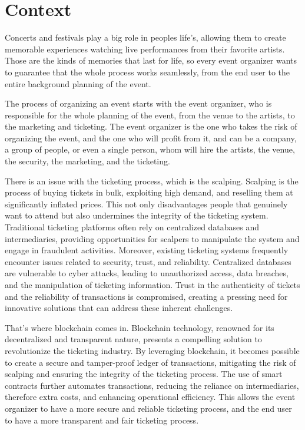 \section{Context}
Concerts and festivals play a big role in peoples life's, allowing them to create memorable experiences watching live performances from their favorite artists. Those are the kinds of memories that last for life, so every event organizer wants to guarantee that the whole process works seamlessly, from the end user to the entire background planning of the event.

The process of organizing an event starts with the event organizer, who is responsible for the whole planning of the event, from the venue to the artists, to the marketing and ticketing. The event organizer is the one who takes the risk of organizing the event, and the one who will profit from it, and can be a company, a group of people, or even a single person, whom will hire the artists, the venue, the security, the marketing, and the ticketing.

There is an issue with the ticketing process, which is the scalping. Scalping is the process of buying tickets in bulk, exploiting high demand, and reselling them at significantly inflated prices. This not only disadvantages people that genuinely want to attend but also undermines the integrity of the ticketing system. Traditional ticketing platforms often rely on centralized databases and intermediaries, providing opportunities for scalpers to manipulate the system and engage in fraudulent activities.
Moreover, existing ticketing systems frequently encounter issues related to security, trust, and reliability. Centralized databases are vulnerable to cyber attacks, leading to unauthorized access, data breaches, and the manipulation of ticketing information. Trust in the authenticity of tickets and the reliability of transactions is compromised, creating a pressing need for innovative solutions that can address these inherent challenges.

That's where blockchain comes in. Blockchain technology, renowned for its decentralized and transparent nature, presents a compelling solution to revolutionize the ticketing industry. By leveraging blockchain, it becomes possible to create a secure and tamper-proof ledger of transactions, mitigating the risk of scalping and ensuring the integrity of the ticketing process. The use of smart contracts further automates transactions, reducing the reliance on intermediaries, therefore extra costs, and enhancing operational efficiency. This allows the event organizer to have a more secure and reliable ticketing process, and the end user to have a more transparent and fair ticketing process.



